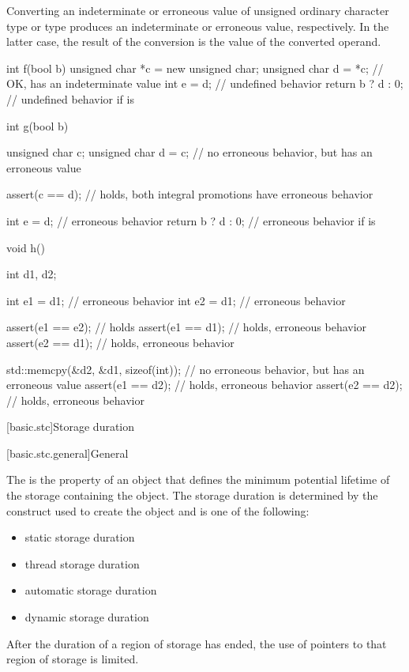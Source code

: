 Converting an indeterminate or erroneous value of
unsigned ordinary character type or  type
produces an indeterminate or erroneous value, respectively.
In the latter case,
the result of the conversion is the value of the converted operand.
\begin{example}
\begin{codeblock}
int f(bool b) {
  unsigned char *c = new unsigned char;
  unsigned char d = *c;         // OK,  has an indeterminate value
  int e = d;                    // undefined behavior
  return b ? d : 0;             // undefined behavior if  is 
}

int g(bool b) {
  unsigned char c;
  unsigned char d = c;          // no erroneous behavior, but  has an erroneous value

  assert(c == d);               // holds, both integral promotions have erroneous behavior

  int e = d;                    // erroneous behavior
  return b ? d : 0;             // erroneous behavior if  is 
}

void h() {
  int d1, d2;

  int e1 = d1;                  // erroneous behavior
  int e2 = d1;                  // erroneous behavior

  assert(e1 == e2);             // holds
  assert(e1 == d1);             // holds, erroneous behavior
  assert(e2 == d1);             // holds, erroneous behavior

  std::memcpy(&d2, &d1, sizeof(int));   // no erroneous behavior, but  has an erroneous value
  assert(e1 == d2);             // holds, erroneous behavior
  assert(e2 == d2);             // holds, erroneous behavior
}
\end{codeblock}
\end{example}

[basic.stc]{Storage duration}

[basic.stc.general]{General}

\pnum
{}%
The  is the property of an object that defines the minimum
potential lifetime of the storage containing the object. The storage
duration is determined by the construct used to create the object and is
one of the following:
\begin{itemize}
\item static storage duration
\item thread storage duration
\item automatic storage duration
\item dynamic storage duration
\end{itemize}
\begin{note}
After the duration of a region of storage has ended,
the use of pointers to that region of storage is limited.
\end{note}

